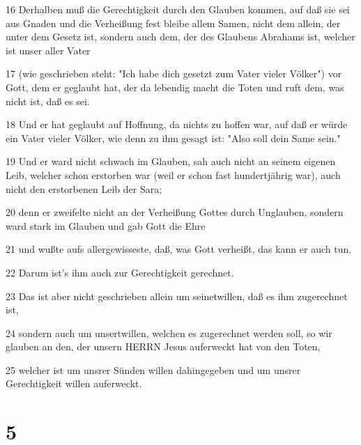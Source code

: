 \par 16 Derhalben muß die Gerechtigkeit durch den Glauben kommen, auf daß sie sei aus Gnaden und die Verheißung fest bleibe allem Samen, nicht dem allein, der unter dem Gesetz ist, sondern auch dem, der des Glaubens Abrahams ist, welcher ist unser aller Vater
\par 17 (wie geschrieben steht: "Ich habe dich gesetzt zum Vater vieler Völker") vor Gott, dem er geglaubt hat, der da lebendig macht die Toten und ruft dem, was nicht ist, daß es sei.
\par 18 Und er hat geglaubt auf Hoffnung, da nichts zu hoffen war, auf daß er würde ein Vater vieler Völker, wie denn zu ihm gesagt ist: "Also soll dein Same sein."
\par 19 Und er ward nicht schwach im Glauben, sah auch nicht an seinem eigenen Leib, welcher schon erstorben war (weil er schon fast hundertjährig war), auch nicht den erstorbenen Leib der Sara;
\par 20 denn er zweifelte nicht an der Verheißung Gottes durch Unglauben, sondern ward stark im Glauben und gab Gott die Ehre
\par 21 und wußte aufs allergewisseste, daß, was Gott verheißt, das kann er auch tun.
\par 22 Darum ist's ihm auch zur Gerechtigkeit gerechnet.
\par 23 Das ist aber nicht geschrieben allein um seinetwillen, daß es ihm zugerechnet ist,
\par 24 sondern auch um unsertwillen, welchen es zugerechnet werden soll, so wir glauben an den, der unsern HERRN Jesus auferweckt hat von den Toten,
\par 25 welcher ist um unsrer Sünden willen dahingegeben und um unsrer Gerechtigkeit willen auferweckt.

\chapter{5}

